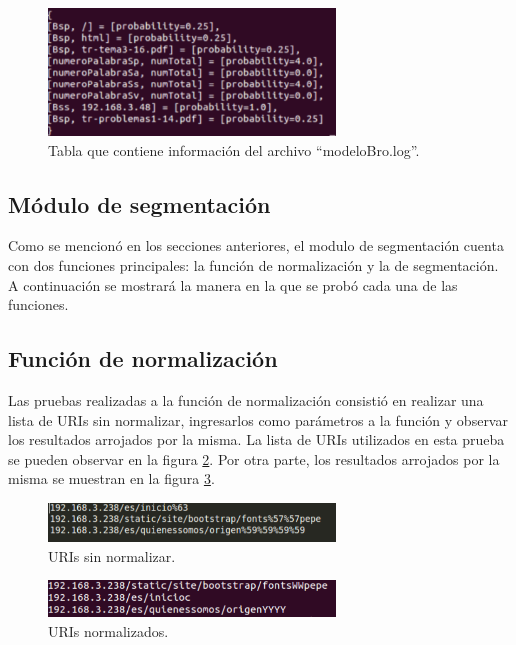 \begin{figure}[!htb]
\begin{center}
\includegraphics[width=3in]{./img/tablaModeloBro.png}
\caption{Tabla que contiene información del archivo ``modeloBro.log''.}
\label{fig:modelResult}
\end{center}
\end{figure}

\subsection*{Módulo de segmentación}

Como se mencionó en los secciones anteriores, el modulo de segmentación
cuenta con dos funciones principales: la función de normalización y la de
segmentación. A continuación se mostrará la manera en la que se probó cada una de las funciones.

\subsection*{Función de normalización}

Las pruebas realizadas a la función de normalización consistió en realizar una lista de URIs sin normalizar, ingresarlos como parámetros a la función y observar los resultados arrojados por la misma.
La lista de URIs utilizados en esta prueba se pueden observar en la figura \ref{fig:uriSinNorm}. Por otra parte, los resultados arrojados por la misma se muestran en la
figura \ref{fig:uriNorm}.

\begin{figure}[!htb]
\begin{center}
\includegraphics[width=3in]{./img/uriSinNorm.png}
\caption{URIs sin normalizar.}
\label{fig:uriSinNorm}
\end{center}
\end{figure}

\begin{figure}[!htb]
\begin{center}
\includegraphics[width=3in]{./img/uriNorm.png}
\caption{URIs normalizados.}
\label{fig:uriNorm}
\end{center}
\end{figure}



